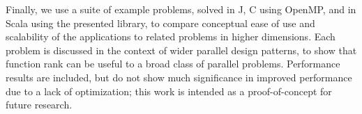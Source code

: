 Finally, we use a suite of example problems, 
solved in J, C using OpenMP, and in Scala using the presented library, 
to compare conceptual ease of use and scalability of the applications to related problems in higher dimensions.
Each problem is discussed in the context of wider parallel design patterns, 
to show that function rank can be useful to a broad class of parallel problems.
Performance results are included, but do not show much significance in improved performance 
due to a lack of optimization; this work is intended as a proof-of-concept for future research.
